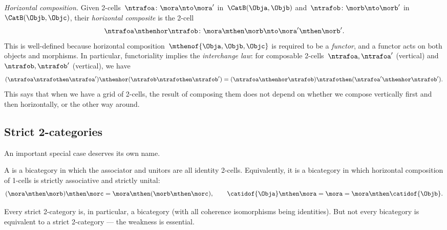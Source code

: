 \emph{Horizontal composition.}
Given 2-cells~$\ntrafoa \colon \mora \nto \mora'$ in~$\CatB(\Obja, \Objb)$ and~$\ntrafob \colon \morb \nto \morb'$ in~$\CatB(\Objb, \Objc)$, their \emph{horizontal composite} is the 2-cell
\begin{equation}
    \ntrafoa \nthenhor \ntrafob \colon \mora \mthen \morb \nto \mora' \mthen \morb'.
\end{equation}
This is well-defined because horizontal composition~$\mthenof{\Obja,\Objb,\Objc}$ is required to be a \emph{functor}, and a functor acts on both objects and morphisms.
In particular, functoriality implies the \emph{interchange law}: for composable 2-cells~$\ntrafoa, \ntrafoa'$ (vertical) and~$\ntrafob, \ntrafob'$ (vertical), we have
\begin{equation}\label{eq:bicat-interchange}
    (\ntrafoa \ntrafothen \ntrafoa') \nthenhor (\ntrafob \ntrafothen \ntrafob') = (\ntrafoa \nthenhor \ntrafob) \ntrafothen (\ntrafoa' \nthenhor \ntrafob').
\end{equation}
This says that when we have a grid of 2-cells, the result of composing them does not depend on whether we compose vertically first and then horizontally, or the other way around.

\subsection{Strict 2-categories}
\label{sec:strict-2cat}

An important special case deserves its own name.

\begin{ctdefinition}
    \label{def:strict-2-category}
    A  is a bicategory in which the associator and unitors are all identity 2-cells.
    Equivalently, it is a bicategory in which horizontal composition of 1-cells is strictly associative and strictly unital:
    \begin{equation}\label{eq:strict-2cat-assoc}
        (\mora \mthen \morb) \mthen \morc = \mora \mthen (\morb \mthen \morc), \qquad \catidof{\Obja} \mthen \mora = \mora = \mora \mthen \catidof{\Objb}.
    \end{equation}
\end{ctdefinition}

Every strict 2-category is, in particular, a bicategory (with all coherence isomorphisms being identities).
But not every bicategory is equivalent to a strict 2-category --- the weakness is essential.

